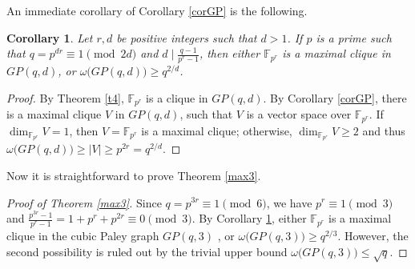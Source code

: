\documentclass[12pt,oneside]{amsart}
\newtheorem{cor}[thm]{Corollary}
\newcommand{\F}{\mathbb{F}}
\begin{document}
An immediate corollary of Corollary \ref{corGP} is the following.

\begin{cor}\label{corrr}
Let $r,d$ be positive integers such that $d>1$. If $p$ is a prime such that $q=p^{dr} \equiv 1 \pmod {2d}$ and $d \mid \frac{q-1}{p^r-1}$, then either $\F_{p^{r}}$ is a maximal clique in $GP(q,d)$, or $\omega\big(GP(q,d)\big) \geq q^{2/d}$.
\end{cor}
\begin{proof}
By Theorem \ref{t4}, $\F_{p^{r}}$ is a clique in $GP(q,d)$. By Corollary \ref{corGP}, there is a maximal clique $V$ in $GP(q,d)$, such that $V$ is a vector space over $\F_{p^r}.$ If $\operatorname{dim}_{\F_{p^r}} V=1$, then $V=\F_{p^r}$ is a maximal clique; otherwise, $\operatorname{dim}_{\F_{p^r}} V \geq 2$ and thus $\omega\big(GP(q,d)\big) \geq |V| \geq p^{2r}=q^{2/d}$.
\end{proof}

Now it is straightforward to prove Theorem \ref{max3}.
\begin{proof}[Proof of Theorem \ref{max3}]
Since $q=p^{3r} \equiv 1 \pmod 6$, we have $p^r \equiv 1 \pmod 3$ and $\frac{p^{3r}-1}{p^r-1}= 1+p^r+p^{2r} \equiv 0 \pmod 3$. By Corollary \ref{corrr}, either $\F_{p^{r}}$ is a maximal clique in the cubic Paley graph $GP(q,3)$ , or $\omega\big(GP(q,3)\big) \geq q^{2/3}$. However, the second possibility is ruled out by the trivial upper bound $\omega\big(GP(q,3)\big) \leq \sqrt{q}$.
\end{proof}
\end{document}
